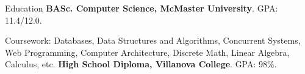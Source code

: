 \begin{rubric}{Education}
\entry*[2022 -- 2026]%
	\textbf{BASc. Computer Science, McMaster University}. GPA: 11.4/12.0.
	\par Coursework: Databases, Data Structures and Algorithms, Concurrent Systems,
Web Programming, Computer Architecture, Discrete Math, Linear Algebra, Calculus, etc.
\entry*[2018 -- 2022]%
\textbf{High School Diploma, Villanova College}. GPA: 98\%.
\end{rubric}
